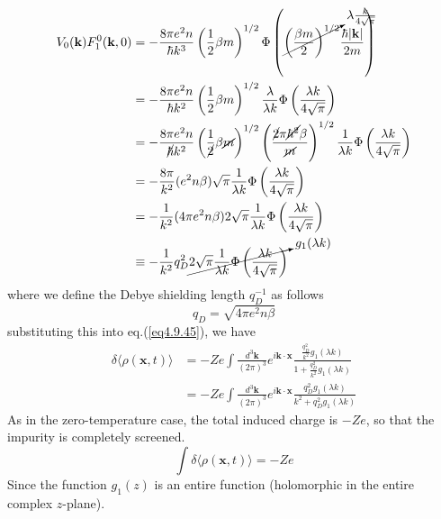 \begin{equation}
\begin{aligned}
V_0(\mathbf k)F^0_1(\mathbf k,0)&=-\frac{8\pi e^2n}{\hbar k^3} \left( \frac{1}{2}\beta m \right)^{1/2} \Phi\left( \cancelto{\lambda\frac{k}{4\sqrt \pi}}{\left( \frac{\beta m}{2} \right)^{1/2}}  \frac{\hbar|\mathbf k|}{2m}\right)\\
&=-\frac{8\pi e^2n}{\hbar k^2} \left( \frac{1}{2}\beta m \right)^{1/2} \frac{\lambda}{\lambda k}\Phi\left( \frac{\lambda k}{4\sqrt\pi} \right)\\
&=-\frac{8\pi e^2n}{\cancel{\hbar} k^2} \left( \frac{1}{\cancel{2}}\beta \cancel{m} \right)^{1/2} \left( \frac{\cancel{2}\pi \cancel{\hbar^2} \beta}{\cancel{m}} \right)^{1/2} \frac{1}{\lambda k} \Phi\left( \frac{\lambda k}{4\sqrt\pi} \right)\\
&=-\frac{8\pi}{k^2}(e^2n\beta)\sqrt\pi\frac{1}{\lambda k}\Phi\left( \frac{\lambda k}{4\sqrt\pi} \right)\\
&=-\frac{1}{k^2}(4\pi e^2n\beta)2\sqrt\pi\frac{1}{\lambda k}\Phi\left( \frac{\lambda k}{4\sqrt\pi} \right)\\
&\equiv -\frac{1}{k^2}q_D^2\cancelto{g_1(\lambda k)}{2\sqrt\pi\frac{1}{\lambda k}\Phi\left( \frac{\lambda k}{4\sqrt\pi} \right)}
\end{aligned}
\end{equation}
where we define the Debye shielding length $q_D^{-1}$ as follows
\begin{equation}
q_D=\sqrt{4\pi e^2 n\beta}
\end{equation}
substituting this into eq.(\ref{eq4.9.45}), we have
\begin{equation}
\begin{aligned}
\delta\langle\rho(\mathbf x,t)\rangle&=-Ze\int \frac{d^3\mathbf k}{(2\pi)^3}e^{i\mathbf k\cdot\mathbf x}\frac{\frac{q_D^2}{k^2}g_1(\lambda k)}{1+\frac{q_D^2}{k^2}g_1(\lambda k)}\\
&=-Ze\int \frac{d^3\mathbf k}{(2\pi)^3}e^{i\mathbf k\cdot\mathbf x}\frac{q_D^2 g_1(\lambda k)}{k^2+q_D^2 g_1(\lambda k)}
\end{aligned}
\end{equation}
 As in the zero-temperature case, the total induced charge is $-Ze$, so that the impurity is completely screened.\\
\begin{equation}
\int \delta\langle\rho(\mathbf x,t)\rangle=-Ze
\end{equation}
Since the function $g_1(z)$ is an entire function (holomorphic in the entire complex $z$-plane).
